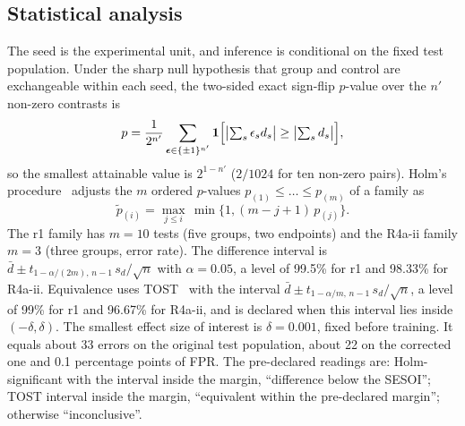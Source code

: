 \documentclass[journal]{IEEEtran}
\begin{document}
\subsection{Statistical analysis}
The seed is the experimental unit, and inference is conditional on the fixed test population.
Under the sharp null hypothesis that group and control are exchangeable within each seed, the
two-sided exact sign-flip $p$-value over the $n'$ non-zero contrasts is
\begin{equation}
p=\frac{1}{2^{n'}}\sum_{\boldsymbol{\epsilon}\in\{\pm1\}^{n'}}
\mathbf{1}\Bigl[\bigl|\textstyle\sum_s\epsilon_s d_s\bigr|\ge\bigl|\textstyle\sum_s d_s\bigr|\Bigr],
\label{eq:signflip}
\end{equation}
so the smallest attainable value is $2^{1-n'}$ ($2/1024$ for ten non-zero pairs). Holm's
procedure~\cite{holm1979} adjusts the $m$ ordered $p$-values $p_{(1)}\le\dots\le p_{(m)}$ of a
family as
\begin{equation}
\tilde p_{(i)}=\max_{j\le i}\,\min\bigl\{1,(m-j+1)\,p_{(j)}\bigr\}.
\label{eq:holm}
\end{equation}
The r1 family has $m=10$ tests (five groups, two endpoints) and the R4a-ii family $m=3$ (three
groups, error rate). The difference interval is $\bar d\pm t_{1-\alpha/(2m),\,n-1}\,s_d/\sqrt n$ with
$\alpha=0.05$, a level of 99.5\% for r1 and 98.33\% for R4a-ii. Equivalence uses
TOST~\cite{schuirmann1987} with the interval $\bar d\pm t_{1-\alpha/m,\,n-1}\,s_d/\sqrt n$, a level of
99\% for r1 and 96.67\% for R4a-ii, and is declared when this interval lies inside $(-\delta,\delta)$.
The smallest effect size of interest is $\delta=0.001$, fixed before training. It equals about 33
errors on the original test population, about 22 on the corrected one and 0.1 percentage points
of FPR. %
The pre-declared readings are: Holm-significant with the interval inside the margin,
``difference below the SESOI''; TOST interval inside the margin, ``equivalent within the
pre-declared margin''; otherwise ``inconclusive''.
\end{document}
